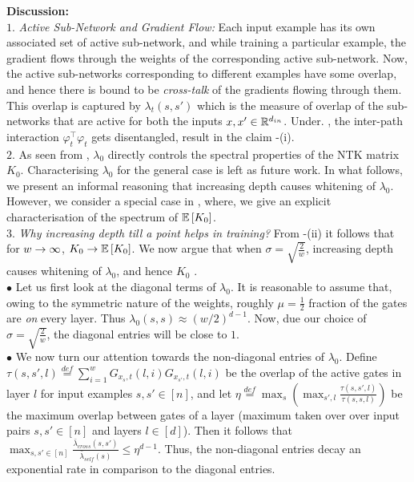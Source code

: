 \textbf{Discussion:}\\
$1.$ \emph{Active Sub-Network and Gradient Flow:}  Each input example has its own associated set of active sub-network, and while training a particular example, the gradient flows through the weights of the corresponding active sub-network. Now, the active sub-networks corresponding to different examples have some overlap, and hence there is bound to be \emph{cross-talk} of the gradients flowing through them. This overlap is captured by $\lambda_t(s,s')$ which is the measure of overlap of the sub-networks that are active for both the inputs $x,x'\in\mathbb{R}^{d_{in}}$. Under. , the inter-path interaction $\varphi^\top_t\varphi_t$ gets disentangled, result in the claim -(i).\\
$2.$ As seen from , $\lambda_0$ directly controls the spectral properties of the NTK matrix $K_0$. Characterising $\lambda_0$ for the general case is left as future work. In what follows, we present an informal reasoning that increasing depth causes whitening of $\lambda_0$. However, we consider a special case in , where, we give an explicit characterisation of the spectrum of $\mathbb{E}\left[K_0\right]$.\\
$3.$ \emph{Why increasing depth till a point helps in training? } From -(ii) it follows that for $w\rightarrow\infty$, $K_0\rightarrow\mathbb{E}\left[K_0\right]$. We now argue that when $\sigma=\sqrt{\frac{2}{w}}$, increasing depth causes whitening of $\lambda_0$, and hence $K_0$ .\hfill\\
$\bullet$ Let us first look at the diagonal terms of $\lambda_0$. It is reasonable to assume that, owing to the symmetric nature of the weights, roughly $\mu=\frac{1}{2}$ fraction of the gates are \emph{on} every layer. Thus $\lambda_0(s,s)\approx (w/2)^{d-1}$. Now, due our choice of $\sigma=\sqrt{\frac{2}{w}}$, the diagonal entries will be close to $1$.\hfill\\
$\bullet$ We now turn our attention towards the non-diagonal entries of $\lambda_0$. Define $\tau(s,s',l)\stackrel{def}=\sum_{i=1}^w G_{x_s,t}(l,i)G_{x_{s'},t}(l,i)$ be the overlap of the active gates in layer $l$ for input examples $s,s'\in[n]$, and  let $\eta\stackrel{def}=\max_s\left(\max_{s',l} \frac{\tau(s,s',l)}{\tau(s,s,l)}\right)$ be the maximum overlap between gates of a layer (maximum taken over over input pairs $s,s'\in[n]$ and layers $l\in [d]$).  Then it follows that $\max_{s,s'\in [n]} \frac{\bar{\lambda}_{cross}(s,s')}{\bar{\lambda}_{self}(s)}\leq \eta^{d-1}$. Thus, the non-diagonal entries decay an exponential rate in comparison to the diagonal entries.\hfill\\
